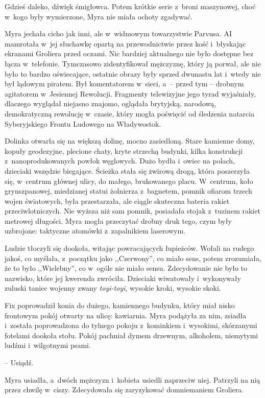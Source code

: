 \documentclass[oneside,polish,11pt,sfheadings]{mwbk}
\begin{document}
Gdzieś daleko, dźwięk śmigłowca. Potem krótkie serie z~broni maszynowej,
choć w~kogo były wymierzone, Myra nie miała ochoty zgadywać.

Myra jechała cicho jak inni, ale w~widmowym towarzystwie Parvusa. AI
mamrotała w~jej słuchawkę opartą na przewodnictwie przez kość i~błyskając ekranami Groliera przed oczami. Nic bardziej aktualnego nie
było dostępne bez łącza w~telefonie. Tymczasowo zidentyfikował
mężczyznę, który ją porwał, ale nie było to bardzo oświecające, ostatnie
obrazy były sprzed dwunastu lat i~wtedy nie był lądowym piratem. Był
komentatorem w~sieci, a~-- przed tym -- drobnym agitatorem w~Jesiennej
Rewolucji. Fragmenty telewizyjne jego tyrad wyjaśniały, dlaczego
wyglądał niejasno znajomo, oglądała brytyjską, narodową, demokratyczną
rewolucję w~czasie, który mogła poświęcić od śledzenia natarcia
Syberyjskiego Frontu Ludowego na Władywostok.

Dolinka otwarła się na większą dolinę, mocno zasiedloną. Stare kamienne
domy, kopuły geodezyjne, plecione chaty, kryte strzechą budynki, kilka
konstrukcji z~nanoprodukowanych powłok węglowych. Dużo bydła i~owiec na
polach, dzieciaki wszędzie biegające. Ścieżka stała się żwirową drogą,
która poszerzyła się, w~centrum głównej ulicy, do małego, brukowanego
placu. W~centrum, koło grynszpanowej, miedzianej statui żołnierza z~bagnetem, pomnik ofiarom trzech wojen światowych, była przestarzała, ale
ciągle skuteczna bateria rakiet przeciwlotniczych. Nie wyższa niż sam
pomnik, posiadała stojak z~tuzinem rakiet metrowej długości. Myra mogła
przeczytać drobny druk tego, czym były uzbrojone: taktyczne atomówki z~zapalnikiem laserowym.

Ludzie tłoczyli się dookoła, witając powracających łupieżców. Wołali na
rudego jakoś, co myślała, z~początku jako ,,Czerwony'', co miało sens,
potem zrozumiała, że to było ,,Wielebny'', co w~ogóle nie miało sensu.
Zdecydowanie nie było to nazwisko, które jej kwerenda zwróciła.
Dzieciaki wiwatowały i~wykonywały zuluski taniec wojenny zwany
\textit{toyi-toyi}, wysokie kroki, wysokie skoki.

Fix poprowadził konia do dużego, kamiennego budynku, który miał nisko
frontowym pokój otwarty na ulicę: kawiarnia. Myra podążyła za nim,
zsiadła i~została poprowadzona do tylnego pokoju z~kominkiem i~wysokimi,
skórzanymi fotelami dookoła stołu. Pokój pachniał dymem drzewnym,
alkoholem, niemytymi ludźmi i~wilgotnymi psami.

-- Usiądź.

Myra usiadła, a~dwóch mężczyzn i~kobieta usiedli naprzeciw niej.
Patrzyli na nią przez chwilę w~ciszy. Zdecydowała się zaryzykować
domniemaniem Groliera.
\end{document}
